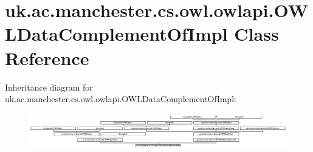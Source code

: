 \hypertarget{classuk_1_1ac_1_1manchester_1_1cs_1_1owl_1_1owlapi_1_1_o_w_l_data_complement_of_impl}{\section{uk.\-ac.\-manchester.\-cs.\-owl.\-owlapi.\-O\-W\-L\-Data\-Complement\-Of\-Impl Class Reference}
\label{classuk_1_1ac_1_1manchester_1_1cs_1_1owl_1_1owlapi_1_1_o_w_l_data_complement_of_impl}
}
Inheritance diagram for uk.\-ac.\-manchester.\-cs.\-owl.\-owlapi.\-O\-W\-L\-Data\-Complement\-Of\-Impl\-:\begin{figure}[H]
\begin{center}
\leavevmode
\includegraphics[height=1.546961cm]{classuk_1_1ac_1_1manchester_1_1cs_1_1owl_1_1owlapi_1_1_o_w_l_data_complement_of_impl}
\end{center}
\end{figure}
